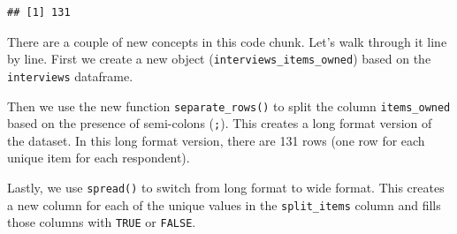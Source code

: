 \documentclass[]{book}
\newenvironment{Shaded}{\begin{snugshade}}{\end{snugshade}}
\newcommand{\KeywordTok}[1]{\textcolor[rgb]{0.13,0.29,0.53}{\textbf{#1}}}
\newcommand{\DataTypeTok}[1]{\textcolor[rgb]{0.13,0.29,0.53}{#1}}
\newcommand{\StringTok}[1]{\textcolor[rgb]{0.31,0.60,0.02}{#1}}
\newcommand{\OtherTok}[1]{\textcolor[rgb]{0.56,0.35,0.01}{#1}}
\newcommand{\OperatorTok}[1]{\textcolor[rgb]{0.81,0.36,0.00}{\textbf{#1}}}
\newcommand{\NormalTok}[1]{#1}
\begin{document}
\begin{Shaded}
\end{Shaded}

\begin{verbatim}
## [1] 131
\end{verbatim}

There are a couple of new concepts in this code chunk. Let's walk
through it line by line. First we create a new object
(\texttt{interviews\_items\_owned}) based on the \texttt{interviews}
dataframe.

\begin{Shaded}
\end{Shaded}

Then we use the new function \texttt{separate\_rows()} to split the
column \texttt{items\_owned} based on the presence of semi-colons
(\texttt{;}). This creates a long format version of the dataset. In this
long format version, there are 131 rows (one row for each unique item
for each respondent).

\begin{Shaded}
\end{Shaded}

Lastly, we use \texttt{spread()} to switch from long format to wide
format. This creates a new column for each of the unique values in the
\texttt{split\_items} column and fills those columns with \texttt{TRUE}
or \texttt{FALSE}.
\end{document}

